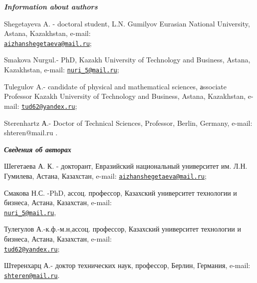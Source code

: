 \begin{authorinfo}
\emph{{\bfseries Information about authors}}

Shegetayeva A. - doctoral student, L.N. Gumilyov Eurasian National
University, Astana, Kazakhstan, e-mail:\\
\href{mailto:aizhanshegetaeva@mail.ru}{\nolinkurl{aizhanshegetaeva@mail.ru}};

Smakova Nurgul.- PhD, Kazakh University of Technology and Business,
Astana, Kazakhstan, e-mail:
\href{mailto:nuri_5@mail.ru}{\nolinkurl{nuri\_5@mail.ru}};

Tulegulov A.- candidate of physical and mathematical sciences, аssociate
Professor Kazakh University of Technology and Business, Astana,
Kazakhstan, e-mail:
\href{mailto:tud62@yandex.ru}{\nolinkurl{tud62@yandex.ru}};

Sterenhartz А.- Doctor of Technical Sciences, Professor, Berlin,
Germany, e-mail: shteren@mail.ru .

\emph{{\bfseries Сведения об авторах}}

Шегетаева А. К. - докторант, Евразийский национальный университет им.
Л.Н. Гумилева, Астана, Казахстан, e-mail:
\href{mailto:aizhanshegetaeva@mail.ru}{\nolinkurl{aizhanshegetaeva@mail.ru}};

Смакова Н.С. -PhD, ассоц. профессор, Казахский университет технологии и
бизнеса, Астана, Казахстан, e-mail:\\
\href{mailto:nuri_5@mail.ru}{\nolinkurl{nuri\_5@mail.ru}},

Тулегулов А.-к.ф.-м.н,ассоц. профессор, Казахский университет технологии
и бизнеса, Астана, Казахстан, e-mail:\\
\href{mailto:tud62@yandex.ru}{\nolinkurl{tud62@yandex.ru}};

Штеренхарц А.- доктор технических наук, профессор, Берлин, Германия,
e-mail: \href{mailto:shteren@mail.ru}{\nolinkurl{shteren@mail.ru}}.\
\end{authorinfo}
